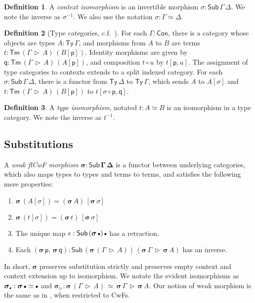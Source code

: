 \documentclass{article}
\theoremstyle{definition}
\newtheorem{definition}{Definition}
\theoremstyle{theorem}
\newcommand{\Con}{\mathsf{Con}}
\newcommand{\Sub}{\mathsf{Sub}}
\newcommand{\Tm}{\mathsf{Tm}}
\newcommand{\Ty}{\mathsf{Ty}}
\newcommand{\ext}{\triangleright}
\newcommand{\emptycon}{\scaleobj{.75}\bullet}
\newcommand{\p}{\mathsf{p}}
\newcommand{\q}{\mathsf{q}}
\newcommand{\bsigma}{\boldsymbol{\sigma}}
\begin{document}
\begin{definition}
A \emph{context isomorphism} is an invertible morphism $\sigma :
\Sub\,\Gamma\,\Delta$. We note the inverse as $\sigma^{-1}$. We also use the
notation $\sigma : \Gamma \simeq \Delta$.
\end{definition}

\begin{definition}[Type categories, c.f.\ \cite{clairambault2014biequivalence}]
\label{def:type_categories} For each $\Gamma : \Con$, there is a category
whose objects are types $A : \Ty\,\Gamma$, and morphisms from $A$ to $B$ are
terms $t : \Tm\,(\Gamma\,\ext\,A)\,(B[\p])$. Identity morphisms are given by $\q
: \Tm\,(\Gamma\,\ext\,A)\,(A[\p])$, and composition $t \circ u$ by $t[\p,
  u]$. The assignment of type categories to contexts extends to a split indexed
category. For each $\sigma : \Sub\,\Gamma\,\Delta$, there is a functor from
$\Ty\,\Delta$ to $\Ty\,\Gamma$, which sends $A$ to $A[\sigma]$ and $t :
\Tm\,(\Gamma\,\ext\,A)\,(B[\p])$ to $t[\sigma\circ \p, \q]$.
\end{definition}

\begin{definition} A \emph{type isomorphism}, notated $t : A \simeq B$ is an isomorphism in a type category. We note the inverse as $t^{-1}$.
\end{definition}

\subsection{Substitutions}
\label{sec:substitutions}

A \emph{weak flCwF morphism} $\boldsymbol{\sigma : \Sub\,\Gamma\,\Delta}$ is a
functor between underlying categories, which also maps types to types and terms
to terms, and satisfies the following mere properties:
  \begin{enumerate}
    \item $\bsigma\,(A[\sigma]) = (\bsigma\,A)\,[\bsigma\,\sigma]$
    \item $\bsigma\,(t[\sigma]) = (\bsigma\,t)\,[\bsigma\,\sigma]$
    \item The unique map $\epsilon : \Sub\,(\bsigma\,\emptycon)\,\emptycon$ has a retraction.
    \item Each $(\bsigma\,\p,\,\bsigma\,\q) : \Sub\,(\bsigma\,(\Gamma\,\ext\,A))\,(\bsigma\,\Gamma\,\ext\,\bsigma\,A)$ has an inverse.
  \end{enumerate}


In short, $\bsigma$ preserves substitution strictly and preserves empty context
and context extension up to isomorphism. We notate the evident isomorphisms as
$\bsigma_{\emptycon} : \bsigma\,\emptycon \simeq \emptycon$ and $\bsigma_{\ext}
: \bsigma\,(\Gamma\,\ext\,A)\,\simeq\,\bsigma\,\Gamma\,\ext\,\bsigma\,A$. Our
notion of weak morphism is the same as in \cite{birkedal2020modal}, when
restricted to CwFs.
\end{document}
